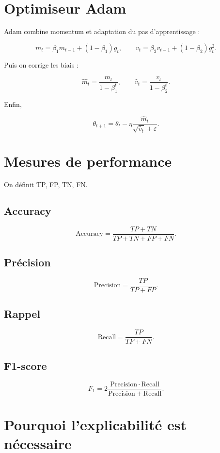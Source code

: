 \documentclass[11pt,a4paper]{article}
\begin{document}
\section{Optimiseur Adam}

Adam combine momentum et adaptation du pas d'apprentissage :

\[
m_t = \beta_1 m_{t-1} + (1-\beta_1)g_t,
\qquad
v_t = \beta_2 v_{t-1} + (1-\beta_2)g_t^2.
\]

Puis on corrige les biais :

\[
\hat m_t = \frac{m_t}{1-\beta_1^t},
\qquad
\hat v_t = \frac{v_t}{1-\beta_2^t}.
\]

Enfin,

\[
\theta_{t+1} = \theta_t - \eta \frac{\hat m_t}{\sqrt{\hat v_t}+\varepsilon}.
\]

\section{Mesures de performance}

On définit TP, FP, TN, FN.

\subsection{Accuracy}

\[
\mathrm{Accuracy} = \frac{TP+TN}{TP+TN+FP+FN}.
\]

\subsection{Précision}

\[
\mathrm{Precision} = \frac{TP}{TP+FP}.
\]

\subsection{Rappel}

\[
\mathrm{Recall} = \frac{TP}{TP+FN}.
\]

\subsection{F1-score}

\[
F_1 = 2\frac{\mathrm{Precision}\cdot\mathrm{Recall}}{\mathrm{Precision}+\mathrm{Recall}}.
\]

\section{Pourquoi l'explicabilité est nécessaire}
\end{document}
